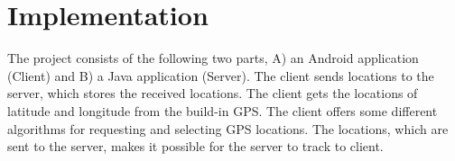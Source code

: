 \section{Implementation}
The project consists of the following two parts, A) an Android application (Client) and B) a Java application (Server). The client sends locations to the server, which stores the received locations. The client gets the locations of latitude and longitude from the build-in GPS. The client offers some different algorithms for requesting and selecting GPS locations. The locations, which are sent to the server, makes it possible for the server to track to client.


